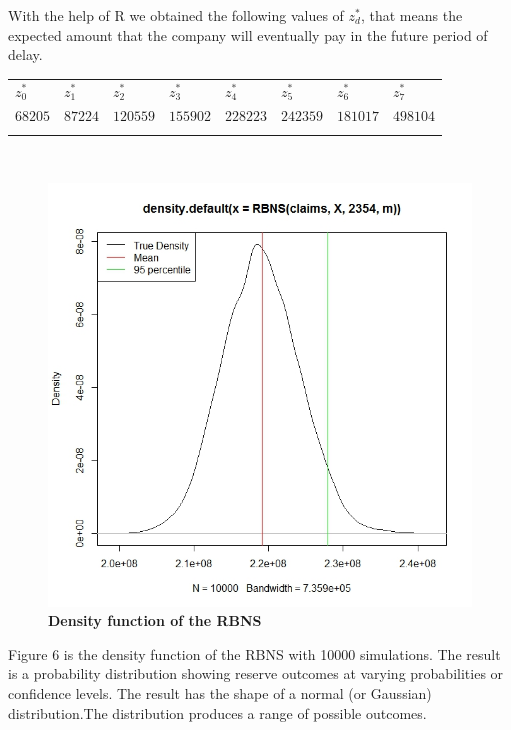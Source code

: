\documentclass[a4paper]{article}
\begin{document}
With the help of R we obtained the following values of $z_d^*$, that means the expected amount that the company will eventually  pay in the future period of delay.\\


\begin{tabular}{ p{1.5cm} p{1.5cm}  p{1.5cm}  p{1.5cm} p{1.5cm}  p{1.5cm} p{1.5cm} p{1.5cm} } \\
\hline \noalign{\smallskip}
$z_0^* $ &$z_1^* $ &$z_2^* $ &$z_3^* $& $z_4^* $& $z_5^* $& $z_6^* $& $z_7^*$  \\ [.5cm]
$68205 $ & $87224$ & $ 120559$ & $155902 $ & $228223$ & $242359 $ & $181017 $ & $498104$\\ [.1cm]
\hline   \\

\end{tabular} \\








\begin{figure}[h]
  \centering
  \includegraphics[scale=0.3]{Reserve_RBNS_couleur.jpeg}
  \caption{\textbf{Density function of the RBNS}}
\end{figure}


Figure 6 is the density function of the RBNS with 10000 simulations. The result is a probability distribution showing reserve outcomes at varying probabilities or confidence levels. The result has the shape of a normal (or Gaussian) distribution.The distribution produces a range of possible outcomes.
\end{document}
